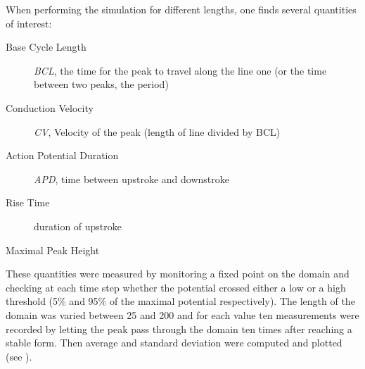 
When performing the simulation for different lengths, one finds several
quantities of interest:
\begin{description}
    \item[Base Cycle Length] \emph{BCL}, the time for the peak to travel along
        the line one (or the time between two peaks, the period)
    \item[Conduction Velocity] \emph{CV}, Velocity of the peak (length of line
        divided by BCL)
    \item[Action Potential Duration] \emph{APD}, time between upstroke and
        downstroke
    \item[Rise Time] duration of upstroke
    \item[Maximal Peak Height]
\end{description}

These quantities were measured by monitoring a fixed point on the domain and
checking at each time step whether the potential crossed either a low or a high
threshold (5\% and 95\% of the maximal potential respectively).
The length of the domain was varied between 25 and 200 and for each value ten
measurements were recorded by letting the peak pass through the domain ten times after
reaching a stable form. Then average and standard deviation were computed and
plotted (see ).

